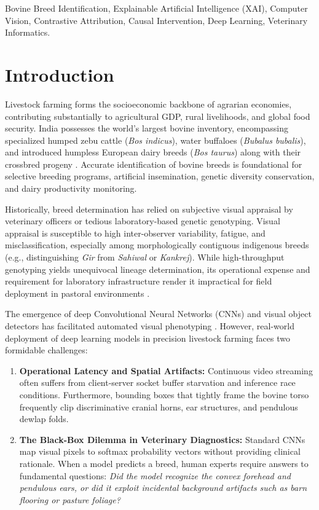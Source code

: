 \documentclass[conference]{IEEEtran}
\begin{document}
\begin{IEEEkeywords}
Bovine Breed Identification, Explainable Artificial Intelligence (XAI), Computer Vision, Contrastive Attribution, Causal Intervention, Deep Learning, Veterinary Informatics.
\end{IEEEkeywords}

\section{Introduction}
Livestock farming forms the socioeconomic backbone of agrarian economies, contributing substantially to agricultural GDP, rural livelihoods, and global food security. India possesses the world's largest bovine inventory, encompassing specialized humped zebu cattle (\textit{Bos indicus}), water buffaloes (\textit{Bubalus bubalis}), and introduced humpless European dairy breeds (\textit{Bos taurus}) along with their crossbred progeny \cite{nddb2023}. Accurate identification of bovine breeds is foundational for selective breeding programs, artificial insemination, genetic diversity conservation, and dairy productivity monitoring. 

Historically, breed determination has relied on subjective visual appraisal by veterinary officers or tedious laboratory-based genetic genotyping. Visual appraisal is susceptible to high inter-observer variability, fatigue, and misclassification, especially among morphologically contiguous indigenous breeds (e.g., distinguishing \textit{Gir} from \textit{Sahiwal} or \textit{Kankrej}). While high-throughput genotyping yields unequivocal lineage determination, its operational expense and requirement for laboratory infrastructure render it impractical for field deployment in pastoral environments \cite{kumar2020genomics}.

The emergence of deep Convolutional Neural Networks (CNNs) and visual object detectors has facilitated automated visual phenotyping \cite{redmon2018yolo, simonyan2014vgg}. However, real-world deployment of deep learning models in precision livestock farming faces two formidable challenges:
\begin{enumerate}
    \item \textbf{Operational Latency and Spatial Artifacts:} Continuous video streaming often suffers from client-server socket buffer starvation and inference race conditions. Furthermore, bounding boxes that tightly frame the bovine torso frequently clip discriminative cranial horns, ear structures, and pendulous dewlap folds.
    \item \textbf{The Black-Box Dilemma in Veterinary Diagnostics:} Standard CNNs map visual pixels to softmax probability vectors without providing clinical rationale. When a model predicts a breed, human experts require answers to fundamental questions: \textit{Did the model recognize the convex forehead and pendulous ears, or did it exploit incidental background artifacts such as barn flooring or pasture foliage?}
\end{enumerate}
\end{document}
